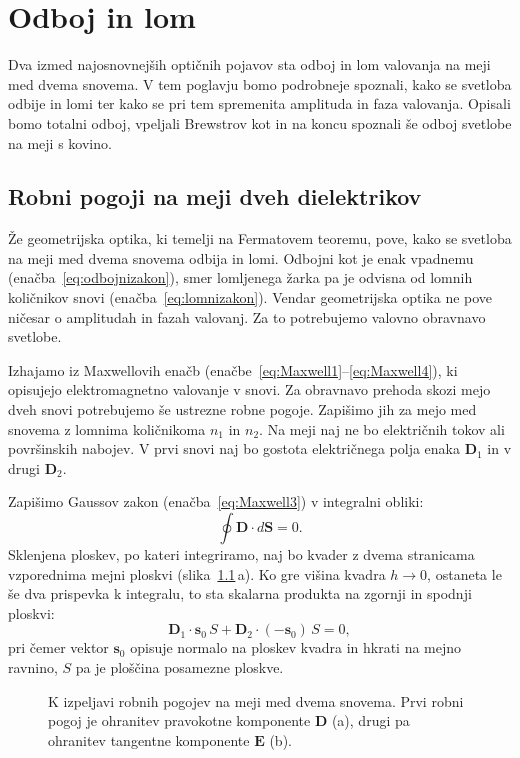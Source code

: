 
\chapter{Odboj in lom}
Dva izmed najosnovnejših optičnih pojavov sta odboj in lom valovanja na meji med 
dvema snovema. V tem poglavju bomo podrobneje spoznali, kako se svetloba odbije in lomi ter
kako se pri tem spremenita amplituda in faza valovanja. Opisali bomo totalni odboj,
vpeljali Brewstrov kot in na koncu spoznali še odboj svetlobe na meji s kovino.

\section{Robni pogoji na meji dveh dielektrikov}
Že geometrijska optika, ki temelji na Fermatovem teoremu, pove, kako se svetloba na 
meji med dvema snovema odbija in lomi. Odbojni kot je enak vpadnemu (enačba~\ref{eq:odbojnizakon}), 
smer lomljenega žarka pa je odvisna od lomnih količnikov snovi (enačba~\ref{eq:lomnizakon}). 
Vendar geometrijska optika ne pove ničesar o amplitudah in fazah valovanj.
Za to potrebujemo valovno obravnavo svetlobe. 

Izhajamo iz Maxwellovih enačb (enačbe~\ref{eq:Maxwell1}--\ref{eq:Maxwell4}), ki 
opisujejo elektromagnetno valovanje v snovi. Za obravnavo prehoda
skozi mejo dveh snovi potrebujemo še ustrezne robne pogoje. Zapišimo jih
za mejo med snovema z lomnima količnikoma
$n_1$ in $n_2$. Na meji naj ne bo električnih tokov ali površinskih nabojev. 
V prvi snovi naj bo gostota električnega polja enaka $\mathbf{D}_1$ in v drugi 
$\mathbf{D}_2$.

Zapišimo Gaussov zakon (enačba~\ref{eq:Maxwell3}) v integralni obliki:
\begin{equation}
\oint \mathbf{D}\cdot d\mathbf{S} = 0.
\label{eq:04_01}
\end{equation}
Sklenjena ploskev, po kateri integriramo, naj bo kvader z dvema stranicama
vzporednima mejni ploskvi (slika~\ref{fig:04_RP}\,a). 
Ko gre višina kvadra $h \to 0$, ostaneta le še dva prispevka k integralu, to sta
skalarna produkta na zgornji
in spodnji ploskvi:
\begin{equation}
\mathbf{D}_1 \cdot \mathbf{s}_0\, S+ \mathbf{D}_2 \cdot (-\mathbf{s}_0)\,S = 0,
\label{eq:04_02}
\end{equation}
pri čemer vektor $\mathbf{s}_0 $ opisuje normalo na ploskev kvadra in hkrati na mejno ravnino, $S$ pa je 
ploščina posamezne ploskve.
\begin{figure}[!ht]
\centering
\def\svgwidth{130truemm} 

\caption{K izpeljavi robnih pogojev na meji med dvema snovema. Prvi robni pogoj je ohranitev
pravokotne komponente $\mathbf{D}$ (a), drugi pa ohranitev tangentne komponente 
$\mathbf{E}$ (b).}
\label{fig:04_RP}
\end{figure}


